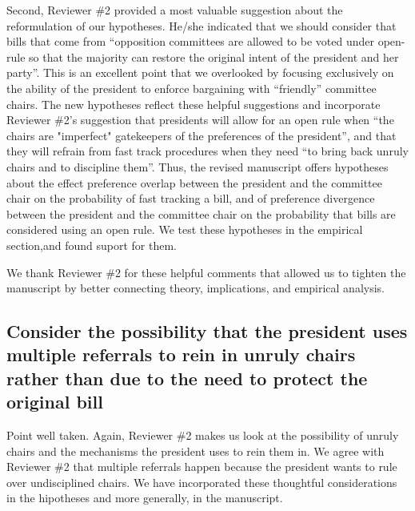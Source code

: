 \documentclass[article,letterpaper,times,12pt,listings-bw,microtype]{article}
\begin{document}
Second, Reviewer \#2 provided a most valuable suggestion about the reformulation of our hypotheses.  He/she indicated that we should consider that bills that come from ``opposition committees are allowed to be voted under open-rule so that the majority can restore the original intent of the president and her party''. This is an excellent point that we overlooked by focusing exclusively on the ability of the president to enforce bargaining with ``friendly'' committee chairs. The new hypotheses reflect these helpful suggestions and incorporate Reviewer \#2's suggestion that presidents will allow for an open rule when ``the chairs are "imperfect" gatekeepers of the preferences of the president'', and that they will refrain from fast track procedures when they need ``to bring back unruly chairs and to discipline them''. Thus, the revised manuscript offers hypotheses about the effect preference overlap between the president and the committee chair on the probability of fast tracking a bill, and of preference divergence between the president and the committee chair on the probability that bills are considered using an open rule. We test these hypotheses in the empirical section,and found suport for them.

We thank Reviewer \#2 for these helpful comments that allowed us to tighten the manuscript by better connecting theory, implications, and empirical analysis. 

 




\subsection{Consider the possibility that the president uses multiple referrals to rein in unruly chairs rather than due to the need to protect the original bill}
Point well taken. Again, Reviewer \#2 makes us look at the possibility of unruly chairs and the mechanisms the president uses to rein them in. We agree with Reviewer \#2 that multiple referrals happen because the president wants to rule over undisciplined chairs. We have incorporated these thoughtful considerations in the hipotheses and more generally, in the manuscript. 
\end{document}
